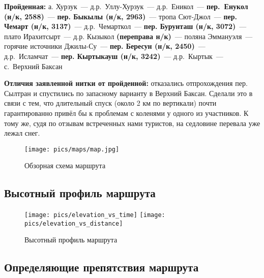 \textbf{Пройденная:} а. Хурзук~--- д.р.~Уллу-Хурзук~--- д.р.~Еникол~--- \textbf{пер.~Енукол (н/к, 2588)}~--- \textbf{пер. Быкылы (н/к, 2963)}~--- тропа Сют-Джол~--- \textbf{пер. Чемарт (н/к, 3137)}~--- д.р.~Чемарткол~--- \textbf{пер. Бурунташ (н/к, 3072)}~--- плато Ирахитсырт~--- д.р. Кызыкол \textbf{(переправа н/к)}~--- поляна Эммануэля~--- горячие источники Джилы-Су~--- \textbf{пер. Бересун (н/к, 2450)}~--- д.р.~Исламчат~---\textbf{ пер. Кыртыкауш (н/к, 3242)}~--- д.р.~Кыртык~--- с.~Верхний Баксан

\textbf{Отличия заявленной нитки от пройденной:} отказались отпрохождения пер. Сылтран и спустились по запасному варианту в Верхний Баксан. Сделали это в связи с тем, что длительный спуск (около 2 км по вертикали) почти гарантированно привёл бы к проблемам с коленями у одного из участников. К тому же, судя по отзывам встреченных нами туристов, на седловине перевала уже лежал снег.

\begin{figure}[h!tbp]
  	\centering	\texttt{[image: pics/maps/map.jpg]}
	\caption{Обзорная схема маршрута}
\end{figure}

\newpage
\subsection{Высотный профиль маршрута}

\begin{figure}[h!]
	\centering
	\texttt{[image: pics/elevation\_vs\_time]}
	\texttt{[image: pics/elevation\_vs\_distance]}
	\caption{Высотный профиль маршрута}
	\label{fig:heights}
\end{figure}

\newpage
\subsection{Определяющие препятствия маршрута}

